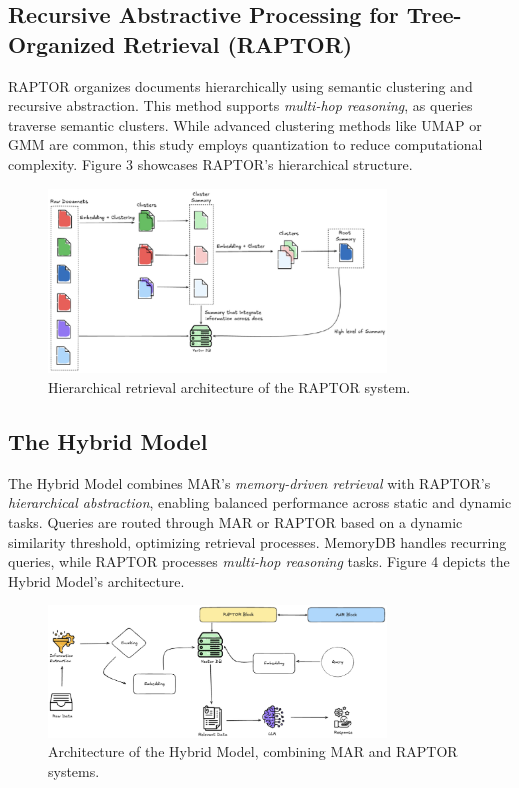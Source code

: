 \documentclass[pdflatex,sn-mathphys-num]{sn-jnl}%
\begin{document}
\subsection{Recursive Abstractive Processing for Tree-Organized Retrieval (RAPTOR)}\label{subsec2}
RAPTOR organizes documents hierarchically using semantic clustering and recursive abstraction. This method supports \emph{multi-hop reasoning}, as queries traverse semantic clusters. While advanced clustering methods like UMAP or GMM are common, this study employs quantization to reduce computational complexity. Figure 3 showcases RAPTOR’s hierarchical structure.


\begin{figure}[h]
    \centering
    \includegraphics[width=0.8\textwidth]{RAPTOR_rag.eps}
    \caption{Hierarchical retrieval architecture of the RAPTOR system.}
    \label{fig:raptor_pipeline}
\end{figure}


\subsection{The Hybrid Model}\label{subsec2}
The Hybrid Model combines MAR’s \emph{memory-driven retrieval} with RAPTOR’s \emph{hierarchical abstraction}, enabling balanced performance across static and dynamic tasks. Queries are routed through MAR or RAPTOR based on a dynamic similarity threshold, optimizing retrieval processes. MemoryDB handles recurring queries, while RAPTOR processes \emph{multi-hop reasoning} tasks. Figure 4 depicts the Hybrid Model’s architecture.

\begin{figure}[h]
    \centering
    \includegraphics[width=0.8\textwidth]{HYBRID_rag.eps}
    \caption{Architecture of the Hybrid Model, combining MAR and RAPTOR systems.}
    \label{fig:hybrid_pipeline}
\end{figure}
\end{document}
